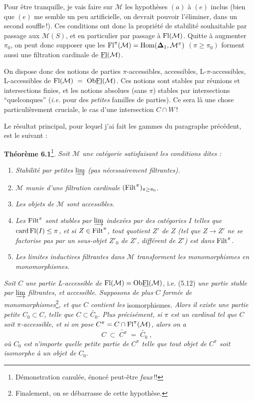 Pour être tranquille, je vais faire sur $\mathcal{M}$ les hypothèses $(a)$ à $(e)$ inclus (bien que $(e)$ me semble un peu artificielle, on devrait pouvoir l'éliminer, dans un second souffle\,!). Ces conditions ont donc la propriété de stabilité souhaitable par passage aux $\mathcal{M}(S)$, et en particulier par passage à $\mathrm{Fl}(\mathcal{M})$. Quitte à augmenter $\pi_{0}$, on peut donc supposer que les $\mathrm{Fl}^{\pi}(\mathcal{M}) = \mathrm{Hom}(\boldsymbol{\Delta}_{1},\mathcal{M}^{\pi})$ $(\pi \geq \pi_{0})$ forment aussi une filtration cardinale de $\underline{\mathrm{Fl}}(\mathcal{M})$.

On dispose donc des notions de parties $\pi$-accessibles, accessibles, L-$\pi$-accessibles, L-accessibles de $\Fl(\mathcal{M}) \ = \ \Ob\uFl(\mathcal{M})$. Ces notions sont stables par réunions et intersections finies, et les notions absolues (sans $\pi$) stables par intersections ``quelconques'' (\textit{i.e.} pour des \textit{petites} familles de parties). Ce sera là une chose particulièrement%
cruciale, le cas d'une intersection $C \cap W$\,!

Le résultat principal, pour lequel j'ai fait les gammes du paragraphe précédent, est le suivant :

\setcounter{footnote}{25}
\textbf{Théorème 6.1}\footnote{Démonstration canulée, énoncé peut-être \textit{faux}\,!!}. \textit{Soit $\mathcal{M}$ une catégorie satisfaisant les conditions dites :}
\begin{enumerate}[label={}]
\item[a)] \textit{Stabilité par petites} $\varinjlim$ \textit{(pas nécessairement filtrantes).}
\item[b)] $\mathcal{M}$ \textit{munie d'une filtration cardinale} $(\mathrm{Filt}^{\pi})_{\pi\geq\pi_{0}}$.
\item[c)] \textit{Les objets de $\mathcal{M}$ sont accessibles.}
\item[d)] \textit{Les} $\mathrm{Filt}^{\pi}$ \textit{sont stables par} $\varinjlim$ \textit{indexées par des catégories $I$ telles que} $\operatorname{card} \mathrm{Fl}(I) \leq \pi$\textit{, et si $Z \in \mathrm{Filt}^{\pi}$, tout quotient $Z'$ de $Z$ (tel que $Z \longrightarrow Z'$ ne se factorise pas par un sous-objet $Z'_{0}$ de $Z'$, différent de $Z'$) est dans} $\mathrm{Filt}^{\pi}$.
\item[e)] \textit{Les limites inductives filtrantes dans $\mathcal{M}$ transforment les monomorphismes en monomorphismes.}
\end{enumerate}
\textit{Soit $C$ une partie L-accessible de} $\mathrm{Fl}(\mathcal{M}) = \mathrm{Ob}\underline{\mathrm{Fl}}(\mathcal{M})$, i.e. (5.12) \textit{une partie stable par} $\varinjlim$ \textit{filtrantes, et accessible. Supposons de plus $C$ formée de monomorphismes}\footnote{Finalement, on se débarrasse de cette hypothèse.}\textit{, et que $C$ contient les} isomorphismes. \textit{Alors il existe une partie petite $C_{0} \subset C$, telle que $C \subset \widetilde{C_{0}}$. Plus précisément, si $\pi$ est un cardinal tel que $C$ soit $\pi$-accessible, et si on pose $C^{\pi} = C \cap \mathrm{Fl}^{\pi}(\mathcal{M})$, alors on a}
\[
C \;\subset\; \widetilde{C^{\pi}} \;=\; \widetilde{C_{0}} \; ,
\tag*{(6.1.1)}
\]
\textit{où $C_{0}$ est n'importe quelle petite partie de $C^{\pi}$ telle que tout objet de $C^{\pi}$ soit isomorphe à un objet de $C_{0}$.}

